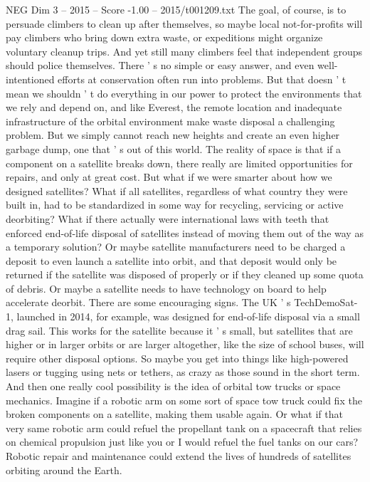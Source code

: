 \begin{textsample}{NEG Dim 3 – 2015 – Score -1.00 – 2015/t001209.txt}
The goal, of course, is to persuade climbers to clean up after themselves, so maybe local not-for-profits will pay climbers who bring down extra waste, or expeditions might organize voluntary cleanup trips.
And yet still many climbers feel that independent groups should police themselves.
There ' s no simple or easy answer, and even well-intentioned efforts at conservation often run into problems.
But that doesn ' t mean we shouldn ' t do everything in our power to protect the environments that we rely and depend on, and like Everest, the remote location and inadequate infrastructure of the orbital environment make waste disposal a challenging problem.
But we simply cannot reach new heights and create an even higher garbage dump, one that ' s out of this world.
The reality of space is that if a component on a satellite breaks down, there really are limited opportunities for repairs, and only at great cost.
But what if we were smarter about how we designed satellites?
What if all satellites, regardless of what country they were built in, had to be standardized in some way for recycling, servicing or active deorbiting?
What if there actually were international laws with teeth that enforced end-of-life disposal of satellites instead of moving them out of the way as a temporary solution?
Or maybe satellite manufacturers need to be charged a deposit to even launch a satellite into orbit, and that deposit would only be returned if the satellite was disposed of properly or if they cleaned up some quota of debris.
Or maybe a satellite needs to have technology on board to help accelerate deorbit.
There are some encouraging signs.
The UK ' s TechDemoSat-1, launched in 2014, for example, was designed for end-of-life disposal via a small drag sail.
This works for the satellite because it ' s small, but satellites that are higher or in larger orbits or are larger altogether, like the size of school buses, will require other disposal options.
So maybe you get into things like high-powered lasers or tugging using nets or tethers, as crazy as those sound in the short term.
And then one really cool possibility is the idea of orbital tow trucks or space mechanics.
Imagine if a robotic arm on some sort of space tow truck could fix the broken components on a satellite, making them usable again.
Or what if that very same robotic arm could refuel the propellant tank on a spacecraft that relies on chemical propulsion just like you or I would refuel the fuel tanks on our cars?
Robotic repair and maintenance could extend the lives of hundreds of satellites orbiting around the Earth.

\end{textsample}
